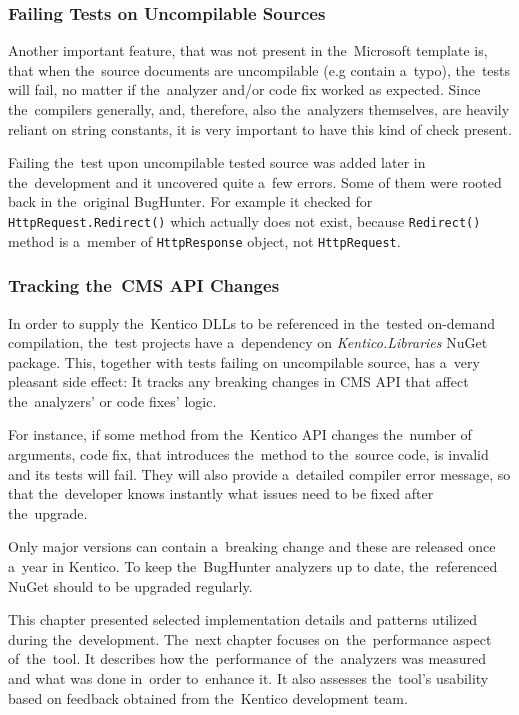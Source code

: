 \documentclass[
  digital, %
  table,   %
  lof,     %
  lot,     %
  oneside,
]{fithesis3}
\begin{document}
\subsubsection{\textbf{Failing Tests on Uncompilable Sources}}
Another important feature, that was not present in the~Microsoft template is, that when the~source documents are uncompilable (e.g contain a~typo), the~tests will fail, no matter if the~analyzer and/or code fix worked as expected. Since the~compilers generally, and, therefore, also the~analyzers themselves, are heavily reliant on string constants, it is very important to have this kind of check present.

Failing the~test upon uncompilable tested source was added later in the~development and it uncovered quite a~few errors. Some of them were rooted back in the~original BugHunter. For example it checked for \texttt{HttpRequest.Redirect()} which actually does not exist, because \texttt{Redirect()} method is a~member of \texttt{HttpResponse} object, not \texttt{HttpRequest}.

\subsubsection{\textbf{Tracking the~CMS API Changes}}
In order to supply the~Kentico DLLs to be referenced in the~tested on-demand compilation, the~test projects have a~dependency on \textit{Kentico.Libraries} NuGet package. This, together with tests failing on uncompilable source, has a~very pleasant side effect: It tracks any breaking changes in CMS API that affect the~analyzers' or code fixes' logic.

For instance, if some method from the~Kentico API changes the~number of arguments, code fix, that introduces the~method to the~source code, is invalid and its tests will fail. They will also provide a~detailed compiler error message, so that the~developer knows instantly what issues need to be fixed after the~upgrade.

Only major versions can contain a~breaking change and these are released once a~year in Kentico. To keep the~BugHunter analyzers up to date, the~referenced NuGet should to be upgraded regularly.

\bigskip\noindent
This chapter presented selected implementation details and patterns utilized during the~development. The~next chapter focuses on~the~performance aspect of~the~tool. It describes how the~performance of~the~analyzers was measured and what was done in~order to~enhance it. It also assesses the~tool's usability based on feedback obtained from the~Kentico development team.
\end{document}

